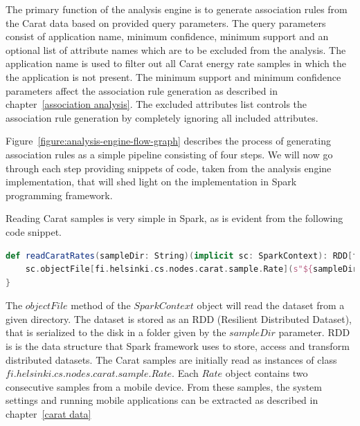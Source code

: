 The primary function of the analysis engine is to generate association rules from the Carat data based on provided query parameters. The query parameters consist of application name, minimum confidence, minimum support and an optional list of attribute names which are to be excluded from the analysis. The application name is used to filter out all Carat energy rate samples in which the the application is not present. The minimum support and minimum confidence parameters affect the association rule generation as described in chapter~\ref{association analysis}. The excluded attributes list controls the association rule generation by completely ignoring all included attributes.    

 
Figure~\ref{figure:analysis-engine-flow-graph} describes the process of generating association rules as a simple pipeline consisting of four steps. We will now go through each step providing snippets of code, taken from the analysis engine implementation, that will shed light on the implementation in Spark programming framework. 

Reading Carat samples is very simple in Spark, as is evident from the following code snippet.  

\begin{minipage}{0.95\linewidth}
\begin{lstlisting}[language=scala]
def readCaratRates(sampleDir: String)(implicit sc: SparkContext): RDD[fi.helsinki.cs.nodes.carat.sample.Rate] = {
	sc.objectFile[fi.helsinki.cs.nodes.carat.sample.Rate](s"${sampleDir}")
}
\end{lstlisting}
\end{minipage}

The $objectFile$ method of the $SparkContext$ object will read the dataset from a given directory. The dataset is stored as an RDD (Resilient Distributed Dataset), that is serialized to the disk in a folder given by the $sampleDir$ parameter. RDD is is the data structure that Spark framework uses to store, access and transform distributed datasets. The Carat samples are initially read as instances of class $fi.helsinki.cs.nodes.carat.sample.Rate$. Each $Rate$ object contains two consecutive samples from a mobile device. From these samples, the system settings and running mobile applications can be extracted as described in chapter~\ref{carat data}  

